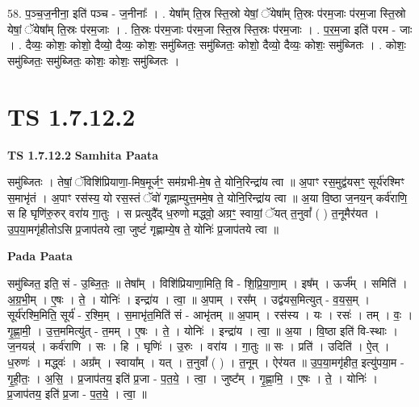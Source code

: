 \documentclass[17pt]{extarticle}
\begin{document}
58. प॒ञ्च॒ज॒नीना॒ इति॑ पञ्च - ज॒नीनाः᳚ । . येषा᳚म् ति॒स्र स्ति॒स्रो येषां॒ ॅयेषा᳚म् ति॒स्रः प॑रम॒जाः प॑रम॒जा स्ति॒स्रो येषां॒ ॅयेषा᳚म् ति॒स्रः प॑रम॒जाः । . ति॒स्रः प॑रम॒जाः प॑रम॒जा स्ति॒स्र स्ति॒स्रः प॑रम॒जाः । . प॒र॒म॒जा इति॑ परम - जाः । . दैव्यः॒ कोशः॒ कोशो॒ दैव्यो॒ दैव्यः॒ कोशः॒ समु॑ब्जितः॒ समु॑ब्जितः॒ कोशो॒ दैव्यो॒ दैव्यः॒ कोशः॒ समु॑ब्जितः । . कोशः॒ समु॑ब्जितः॒ समु॑ब्जितः॒ कोशः॒ कोशः॒ समु॑ब्जितः । \newline
\pagebreak
{}
\section*{ TS 1.7.12.2 }

\textbf{TS 1.7.12.2 } \newline
\textbf{Samhita Paata} \newline

समु॑ब्जितः । तेषां॒ ॅविशि॑प्रियाणा॒-मिष॒मूर्जꣳ॒॒ सम॑ग्रभी-मे॒ष ते॒ योनि॒रिन्द्रा॑य त्वा ॥ अ॒पाꣳ रस॒मुद्व॑यसꣳ॒॒ सूर्य॑रश्मिꣳ स॒माभृ॑तं । अ॒पाꣳ रस॑स्य॒ यो रस॒स्तं ॅवो॑ गृह्णाम्युत्त॒ममे॒ष ते॒ योनि॒रिन्द्रा॑य त्वा ॥ अ॒या वि॒ष्ठा ज॒नय॒न् कर्व॑राणि॒ स हि घृणि॑रु॒रुर् वरा॑य गा॒तुः । स प्रत्युदै᳚द् ध॒रुणो मद्ध्वो॒ अग्रꣳ॒॒ स्वायां॒ ॅयत् त॒नुवां᳚ ( ) त॒नूमैर॑यत । उ॒प॒या॒मगृ॑हीतोऽसि प्र॒जाप॑तये त्वा॒ जुष्टं॑ गृह्णाम्ये॒ष ते॒ योनिः॑ प्र॒जाप॑तये त्वा ॥ \newline

\textbf{Pada Paata} \newline

समु॑ब्जित॒ इति॒ सं - उ॒ब्जि॒तः॒ ॥ तेषा᳚म् । विशि॑प्रियाणा॒मिति॒ वि - शि॒प्रि॒या॒णा॒म् । इष᳚म् । ऊर्ज᳚म् । समिति॑ । अ॒ग्र॒भी॒म् । ए॒षः । ते॒ । योनिः॑ । इन्द्रा॑य । त्वा॒ ॥ अ॒पाम् । रस᳚म् । उद्व॑यस॒मित्युत् - व॒य॒स॒म् । सूर्य॑रश्मि॒मिति॒ सूर्य॑ - र॒श्मि॒म् । स॒माभृ॑त॒मिति॑ सं - आभृ॑तम् ॥ अ॒पाम् । रस॑स्य । यः । रसः॑ । तम् । वः॒ । गृ॒ह्णा॒मी॒ । उ॒त्त॒ममित्यु॑त् - त॒मम् । ए॒षः । ते॒ । योनिः॑ । इन्द्रा॑य । त्वा॒ ॥ अ॒या । वि॒ष्ठा इति॑ वि-स्थाः । ज॒नयन्न्॑ । कर्व॑राणि । सः । हि । घृणिः॑ । उ॒रुः । वरा॑य । गा॒तुः ॥ सः । प्रति॑ । उदिति॑ । ऐ॒त् । ध॒रुणः॑ । मद्ध्वः॑ । अग्र᳚म् । स्वाया᳚म् । यत् । त॒नुवां᳚ ( ) । त॒नूम् । ऐर॑यत ॥ उ॒प॒या॒मगृ॑हीत॒ इत्यु॑पया॒म - गृ॒ही॒तः॒ । अ॒सि॒ । प्र॒जाप॑तय॒ इति॑ प्र॒जा - प॒त॒ये॒ । त्वा॒ । जुष्ट᳚म् । गृ॒ह्णा॒मि॒ । ए॒षः । ते॒ । योनिः॑ । प्र॒जाप॑तय॒ इति॑ प्र॒जा - प॒त॒ये॒ । त्वा॒ ॥  \newline
\end{document}
